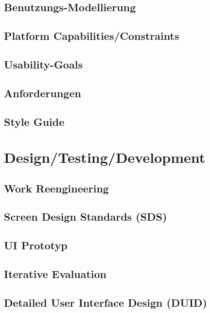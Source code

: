 \documentclass[a4paper,11pt]{article}%
\renewcommand{\\}{\vspace*{0.5\baselineskip} \newline}
\begin{document}
\newpage

\subsection{Benutzungs-Modellierung}

\subsection{Platform Capabilities/Constraints}

\subsection{Usability-Goals}

\subsection{Anforderungen}

\subsection{Style Guide}

\newpage

\section{Design/Testing/Development}

\subsection{Work Reengineering}

\subsection{Screen Design Standards (SDS)}

\subsection{UI Prototyp}

\subsection{Iterative Evaluation}

\subsection{Detailed User Interface Design (DUID)}
\end{document}
